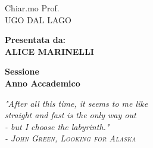 \documentclass[12pt,a4paper,openright,twoside]{report}
\begin{document}
\begin{titlepage}
\begin{titlepage}
\begin{minipage}[t]{0.47\textwidth}
{{                                        Chiar.mo Prof.\\
                                        UGO DAL LAGO}}
                                        \end{minipage}
                                        \hfill
                                        \begin{minipage}[t]{0.47\textwidth}\raggedleft
                                        {\large{\bf Presentata da:\\
                                        ALICE MARINELLI}}
                                        \end{minipage}
                                        \vspace{20mm}
                                        \begin{center}
                                        {\large{\bf Sessione\\%
                                        Anno Accademico }}%
                                        \end{center}
                                        \end{titlepage}
                                        \thispagestyle{empty}                   %
                                        \topmargin=6.5cm                        %
                                        \raggedleft                             %
                                        \large                                  %
                                        \em                                     %
                                        "After all this time, it seems to me like \\
                                        straight and fast is the only way out \\
                                        - but I choose the labyrinth." \\
                                        \textsc{- John Green, Looking for Alaska} \\
                                        \newpage                                %
                                        \clearpage{\pagestyle{empty}\cleardoublepage}%
                                        \end{titlepage}
\end{document}
